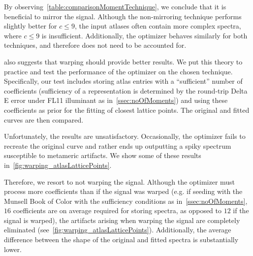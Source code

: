 By observing~\cref{table:comparisonMomentTechnique}, we conclude that it is beneficial to mirror the signal. Although the non-mirroring technique performs slightly better for $c \le 9$, the input atlases often contain more complex spectra, where $c \le 9$ is insufficient. Additionally, the optimizer behaves similarly for both techniques, and therefore does not need to be accounted for.

 also suggests that warping should provide better results. We put this theory to practice and test the performance of the optimizer on the chosen technique. Specifically, our test includes storing atlas entries with a ``sufficient'' number of coefficients (sufficiency of a representation is determined by the round-trip Delta E error under FL11 illuminant as in~\cref{ssec:noOfMoments}) and using these coefficients as prior for the fitting of closest lattice points. The original and fitted curves are then compared.

Unfortunately, the results are unsatisfactory. Occasionally, the optimizer fails to recreate the original curve and rather ends up outputting a spiky spectrum susceptible to metameric artifacts. We show some of these results in~\cref{fig:warping_atlasLatticePoints}.

Therefore, we resort to not warping the signal. Although the optimizer must process more coefficients than if the signal was warped (e.g. if seeding with the Munsell Book of Color with the sufficiency conditions as in~\cref{ssec:noOfMoments}, $16$ coefficients are on average required for storing spectra, as opposed to $12$ if the signal is warped), the artifacts arising when warping the signal are completely eliminated (see~\cref{fig:warping_atlasLatticePoints}). Additionally, the average difference between the shape of the original and fitted spectra is substantially lower.


